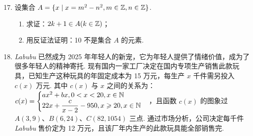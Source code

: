 \documentclass[a4paper,11pt]{article}
\begin{document}

\begin{enumerate}
\setcounter{enumi}{16}

\item 设集合 $A=\{x\mid x=m^2-n^2,m\in\mathbb{Z},n\in\mathbb{Z}\}$.

\begin{enumerate}[label=(\arabic*)]
\item 求证：$2k+1\in A(k\in\mathbb{Z})$；
\item 用反证法证明：10 不是集合 $A$ 的元素.
\end{enumerate}

\ifanswer
\solbegin
{}
\solend
\fi

\ansspace[6]

\ansneed{20cm}
\item \textit{Labubu} 已然成为 2025 年年轻人的新宠，它为年轻人提供了情绪价值，成为了很多年轻人的精神寄托. 现有国内一家工厂决定在国内专项生产销售此款玩具，已知生产这种玩具的年固定成本为 15 万元，每生产 $x$ 千件需另投入 $c(x)$ 万元. 其中 $c(x)$ 与 $x$ 之间的关系为：$c(x)=\begin{cases}ax^2+bx,0<x<20,x\in\mathbb{N}\\ 22x+\dfrac c{x-2}-950,x\geqslant20,x\in\mathbb{N}\end{cases}$，且函数 $c(x)$ 的图象过 $A(3,9)$、$B(6,24)$、$C(82,1054)$ 三点. 通过市场分析，公司决定每千件 \textit{Labubu} 售价定为 12 万元，且该厂年内生产的此款玩具能全部销售完.


\end{enumerate}
\end{document}
